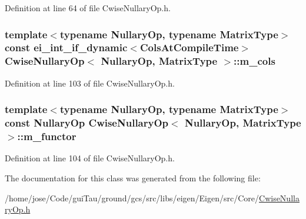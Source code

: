 Definition at line 64 of file Cwise\-Nullary\-Op.\-h.

\hypertarget{class_cwise_nullary_op_a92d550c66800b83ee79adb67eb598726}{
\subsubsection[{m\-\_\-cols}]{\setlength{\rightskip}{0pt plus 5cm}template$<$typename Nullary\-Op, typename Matrix\-Type$>$ const ei\-\_\-int\-\_\-if\-\_\-dynamic$<${\bf Cols\-At\-Compile\-Time}$>$ {\bf Cwise\-Nullary\-Op}$<$ Nullary\-Op, Matrix\-Type $>$\-::m\-\_\-cols}}\label{class_cwise_nullary_op_a92d550c66800b83ee79adb67eb598726}


Definition at line 103 of file Cwise\-Nullary\-Op.\-h.

\hypertarget{class_cwise_nullary_op_a059f642569a46d7b0a6dd2f98c4e4e3d}{
\subsubsection[{m\-\_\-functor}]{\setlength{\rightskip}{0pt plus 5cm}template$<$typename Nullary\-Op, typename Matrix\-Type$>$ const Nullary\-Op {\bf Cwise\-Nullary\-Op}$<$ Nullary\-Op, Matrix\-Type $>$\-::m\-\_\-functor}}\label{class_cwise_nullary_op_a059f642569a46d7b0a6dd2f98c4e4e3d}


Definition at line 104 of file Cwise\-Nullary\-Op.\-h.



The documentation for this class was generated from the following file\-:\begin{DoxyCompactItemize}
\item 
/home/jose/\-Code/gui\-Tau/ground/gcs/src/libs/eigen/\-Eigen/src/\-Core/\hyperlink{_cwise_nullary_op_8h}{Cwise\-Nullary\-Op.\-h}\end{DoxyCompactItemize}

